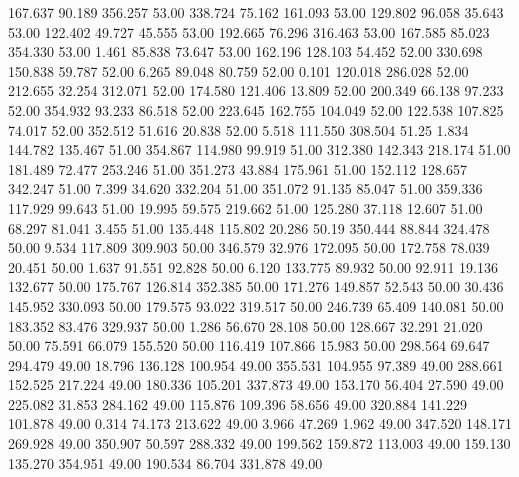  167.637   90.189  356.257        53.00
 338.724   75.162  161.093        53.00
 129.802   96.058   35.643        53.00
 122.402   49.727   45.555        53.00
 192.665   76.296  316.463        53.00
 167.585   85.023  354.330        53.00
   1.461   85.838   73.647        53.00
 162.196  128.103   54.452        52.00
 330.698  150.838   59.787        52.00
   6.265   89.048   80.759        52.00
   0.101  120.018  286.028        52.00
 212.655   32.254  312.071        52.00
 174.580  121.406   13.809        52.00
 200.349   66.138   97.233        52.00
 354.932   93.233   86.518        52.00
 223.645  162.755  104.049        52.00
 122.538  107.825   74.017        52.00
 352.512   51.616   20.838        52.00
   5.518  111.550  308.504        51.25
   1.834  144.782  135.467        51.00
 354.867  114.980   99.919        51.00
 312.380  142.343  218.174        51.00
 181.489   72.477  253.246        51.00
 351.273   43.884  175.961        51.00
 152.112  128.657  342.247        51.00
   7.399   34.620  332.204        51.00
 351.072   91.135   85.047        51.00
 359.336  117.929   99.643        51.00
  19.995   59.575  219.662        51.00
 125.280   37.118   12.607        51.00
  68.297   81.041    3.455        51.00
 135.448  115.802   20.286        50.19
 350.444   88.844  324.478        50.00
   9.534  117.809  309.903        50.00
 346.579   32.976  172.095        50.00
 172.758   78.039   20.451        50.00
   1.637   91.551   92.828        50.00
   6.120  133.775   89.932        50.00
  92.911   19.136  132.677        50.00
 175.767  126.814  352.385        50.00
 171.276  149.857   52.543        50.00
  30.436  145.952  330.093        50.00
 179.575   93.022  319.517        50.00
 246.739   65.409  140.081        50.00
 183.352   83.476  329.937        50.00
   1.286   56.670   28.108        50.00
 128.667   32.291   21.020        50.00
  75.591   66.079  155.520        50.00
 116.419  107.866   15.983        50.00
 298.564   69.647  294.479        49.00
  18.796  136.128  100.954        49.00
 355.531  104.955   97.389        49.00
 288.661  152.525  217.224        49.00
 180.336  105.201  337.873        49.00
 153.170   56.404   27.590        49.00
 225.082   31.853  284.162        49.00
 115.876  109.396   58.656        49.00
 320.884  141.229  101.878        49.00
   0.314   74.173  213.622        49.00
   3.966   47.269    1.962        49.00
 347.520  148.171  269.928        49.00
 350.907   50.597  288.332        49.00
 199.562  159.872  113.003        49.00
 159.130  135.270  354.951        49.00
 190.534   86.704  331.878        49.00
